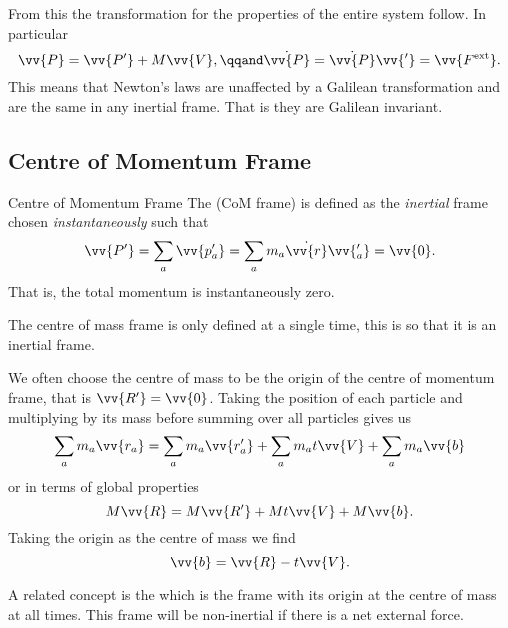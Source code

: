\documentclass[fleqn]{NotesClass}
\newcommand*{\ext}{\mathrm{ext}}
\begin{document}
    From this the transformation for the properties of the entire system follow.
    In particular
    \begin{equation}
        \vv{P} = \vv{P'} + M\vv{V}, \qqand \dot{\vv{P}} = \dot{\vv{P}}\vv{'} = \vv{F^{\ext}}.
    \end{equation}
    This means that Newton's laws are unaffected by a Galilean transformation and are the same in any inertial frame.
    That is they are Galilean invariant.
    
    \subsection{Centre of Momentum Frame}
    \begin{dfn}{Centre of Momentum Frame}{}
        The  (CoM frame) is defined as the \emph{inertial} frame chosen \emph{instantaneously} such that 
        \begin{equation}
            \vv{P'} = \sum_{a}\vv{p_a'} = \sum_{a} m_a\dot{\vv{r}}\vv{_a'} = \vv{0}.
        \end{equation}
        That is, the total momentum is instantaneously zero.
    \end{dfn}
    
    The centre of mass frame is only defined at a single time, this is so that it is an inertial frame.
    
    We often choose the centre of mass to be the origin of the centre of momentum frame, that is \(\vv{R'} = \vv{0}\).
    Taking the position of each particle and multiplying by its mass before summing over all particles gives us
    \begin{equation}
        \sum_a m_a\vv{r_a} = \sum_a m_a\vv{r_a'} + \sum_a m_at\vv{V} + \sum_a m_a\vv{b}
    \end{equation}
    or in terms of global properties
    \begin{equation}
        M\vv{R} = M\vv{R'} + Mt\vv{V} + M\vv{b}.
    \end{equation}
    Taking the origin as the centre of mass we find
    \begin{equation}
        \vv{b} = \vv{R} - t\vv{V}.
    \end{equation}
    
    A related concept is the  which is the frame with its origin at the centre of mass at all times.
    This frame will be non-inertial if there is a net external force.
    
\end{document}
